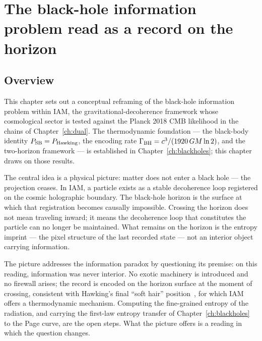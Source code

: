 
\chapter{The black-hole information problem read as a record on the horizon}\label{ch:bhinformation}

\section*{Overview}
This chapter sets out a conceptual reframing of the black-hole information problem within IAM, the gravitational-decoherence framework whose
cosmological sector is tested against the Planck 2018 CMB likelihood in the chains of Chapter~\ref{ch:dual}. The thermodynamic foundation --- the black-body identity
$P_{\rm SB}=P_{\rm Hawking}$, the encoding rate $\Gamma_{\rm BH}=c^3/(1920\,GM\ln2)$, and the two-horizon framework --- is established in
Chapter~\ref{ch:blackholes}; this chapter draws on those results.

The central idea is a physical picture: matter does not enter a black hole --- the projection ceases. In IAM, a particle exists as a stable decoherence loop
registered on the cosmic holographic boundary. The black-hole horizon is the surface at which that registration becomes causally impossible. Crossing the
horizon does not mean traveling inward; it means the decoherence loop that constitutes the particle can no longer be maintained. What remains on the
horizon is the entropy imprint --- the pixel structure of the last recorded state --- not an interior object carrying information. \conjecture

The picture addresses the information paradox by questioning its premise: on this reading, information was never interior. No exotic machinery is
introduced and no firewall arises; the record is encoded on the horizon surface at the moment of crossing, consistent with Hawking's final ``soft hair''
position~\cite{HawkingPerryStrominger2016}, for which IAM offers a thermodynamic mechanism. Computing the fine-grained entropy of the radiation, and carrying the first-law entropy transfer of Chapter~\ref{ch:blackholes} to the Page curve, are the open steps. What the picture offers is a
reading in which the question changes. \interp

